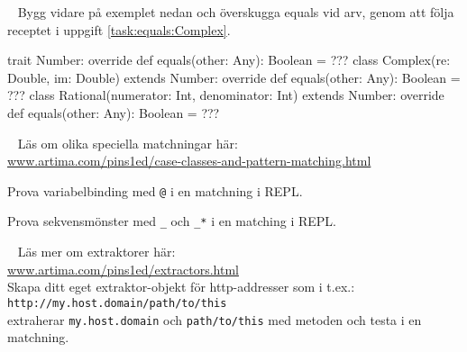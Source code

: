 \SOLUTION


\TaskSolved \what



\QUESTEND







\QUESTBEGIN

\Task  \what~ Bygg vidare på exemplet nedan och överskugga equals vid arv, genom att följa receptet i uppgift \ref{task:equals:Complex}.
\begin{Code}
trait Number:
  override def equals(other: Any): Boolean = ???
class Complex(re: Double, im: Double) extends Number:
  override def equals(other: Any): Boolean = ???
class Rational(numerator: Int, denominator: Int) extends Number:
  override def equals(other: Any): Boolean = ???
\end{Code}


\SOLUTION


\TaskSolved \what



\QUESTEND







\QUESTBEGIN

\Task  \what~ Läs om olika speciella matchningar här: \\
\href{http://www.artima.com/pins1ed/case-classes-and-pattern-matching.html}{www.artima.com/pins1ed/case-classes-and-pattern-matching.html}

\Subtask Prova variabelbinding med \texttt{@} i en matchning i REPL.

\Subtask Prova sekvensmönster med \texttt{\_} och \texttt{\_*} i en matching i REPL.

\SOLUTION


\TaskSolved \what



\QUESTEND







\QUESTBEGIN

\Task \label{task:extractor} \what~  Läs mer om extraktorer här: \\ \href{http://www.artima.com/pins1ed/extractors.html}{www.artima.com/pins1ed/extractors.html} \\
Skapa ditt eget extraktor-objekt för http-addresser som i t.ex.: \\
\texttt{http://my.host.domain/path/to/this} \\ extraherar \texttt{my.host.domain} och \texttt{path/to/this} med metoden  och testa i en matchning.

